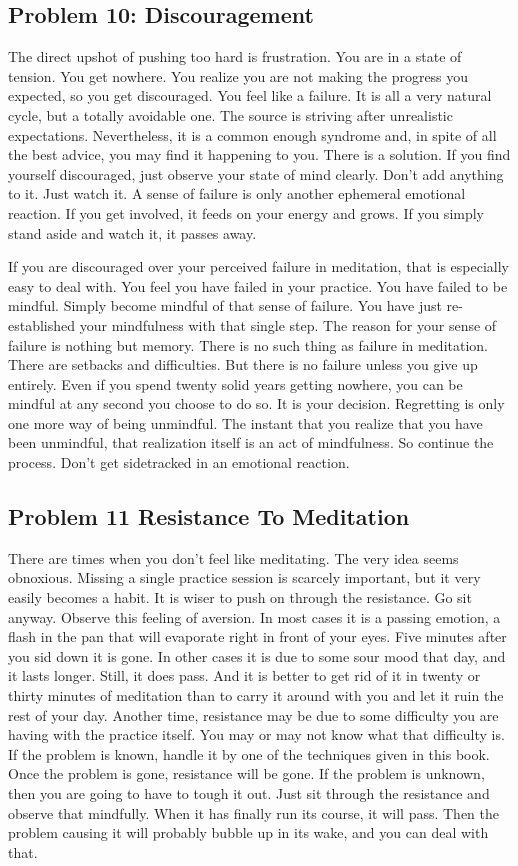\subsection*{Problem 10: Discouragement} The direct upshot of pushing too hard is frustration.
You are in a state of tension. You get nowhere. You realize you are not making
the progress you expected, so you get discouraged. You feel like a failure. It
is all a very natural cycle, but a totally avoidable one. The source is striving
after unrealistic expectations. Nevertheless, it is a common enough syndrome
and, in spite of all the best advice, you may find it happening to you. There is
a solution. If you find yourself discouraged, just observe your state of mind
clearly. Don't add anything to it. Just watch it. A sense of failure is only
another ephemeral emotional reaction. If you get involved, it feeds on your
energy and grows. If you simply stand aside and watch it, it passes away.

If you are discouraged over your perceived failure in meditation, that is
especially easy to deal with. You feel you have failed in your practice. You
have failed to be mindful. Simply become mindful of that sense of failure. You
have just re-established your mindfulness with that single step. The reason for
your sense of failure is nothing but memory. There is no such thing as failure
in meditation. There are setbacks and difficulties. But there is no failure
unless you give up entirely. Even if you spend twenty solid years getting
nowhere, you can be mindful at any second you choose to do so. It is your
decision. Regretting is only one more way of being unmindful. The instant that
you realize that you have been unmindful, that realization itself is an act of
mindfulness.  So continue the process. Don't get sidetracked in an emotional reaction.

\subsection*{Problem 11 Resistance To Meditation}
There are times when you don't feel like meditating. The very idea seems
obnoxious. Missing a single practice session is scarcely important, but it very
easily becomes a habit. It is wiser to push on through the resistance. Go sit
anyway. Observe this feeling of aversion. In most cases it is a passing emotion,
a flash in the pan that will evaporate right in front of your eyes. Five minutes
after you sid down it is gone. In other cases it is due to some sour mood that
day, and it lasts longer. Still, it does pass. And it is better to get rid of it
in twenty or thirty minutes of meditation than to carry it around with you and
let it ruin the rest of your day.  Another time, resistance may be due to some
difficulty you are having with the practice itself. You may or may not know what
that difficulty is. If the problem is known, handle it by one of the techniques
given in this book. Once the problem is gone, resistance will be gone. If the
problem is unknown, then you are going to have to tough it out. Just sit through
the resistance and observe that mindfully. When it has finally run its course,
it will pass. Then the problem causing it will probably bubble up in its wake,
and you can deal with that.

